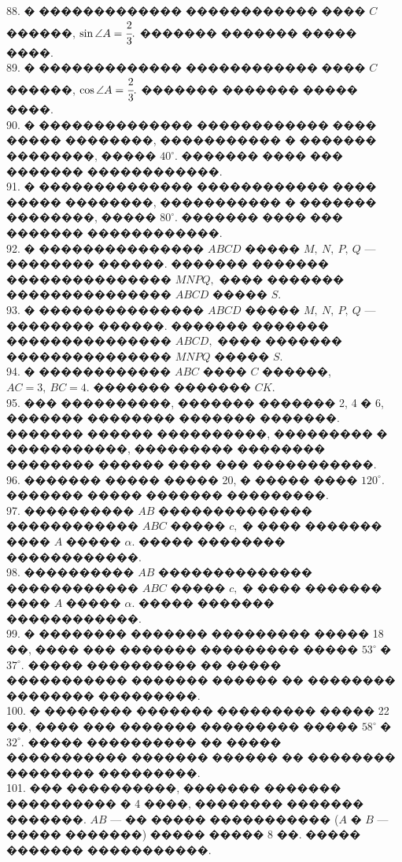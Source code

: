 \documentclass[12pt]{article}
\begin{document}
88. � ������������� ������������ ���� $C$ ������, $\sin \angle A=\cfrac{2}{3}.$ ������� ������� ����� ����.\\
89. � ������������� ������������ ���� $C$ ������, $\cos \angle A=\cfrac{2}{3}.$ ������� ������� ����� ����.\\
90. � �������������� ������������ ���� ����� ��������, ����������� � ������� ��������, ����� $40^\circ.$ ������� ���� ��� ������� ������������.\\
91. � �������������� ������������ ���� ����� ��������, ����������� � ������� ��������, ����� $80^\circ.$ ������� ���� ��� ������� ������������.\\
92. � ��������������� $ABCD$ ����� $M,\ N,\ P,\ Q$ --- �������� ������. ������� ������� ��������������� $MNPQ,$ ���� ������� ��������������� $ABCD$ ����� $S.$\\
93. � ��������������� $ABCD$ ����� $M,\ N,\ P,\ Q$ --- �������� ������. ������� ������� ��������������� $ABCD,$ ���� ������� ��������������� $MNPQ$ ����� $S.$\\
94. � ������������ $ABC$ ���� $C$ ������, $AC=3,\ BC=4.$ ������� ������� $CK.$\\
95. ��� ����������, ������� ������� 2, 4 � 6, ������� �������� ������� �������. ������� ������ ����������, ��������� � �����������, ��������� �������� �������� ������ ���� ��� �����������.\\
96. ������� ����� ����� 20, � ����� ���� $120^\circ.$ ������� ����� ������� ���������.\\
97. ���������� $AB$ �������������� ������������ $ABC$ ����� $c,$ � ���� ������� ���� $A$ ����� $\alpha.$ ����� �������� ������������.\\
98. ���������� $AB$ �������������� ������������ $ABC$ ����� $c,$ � ���� ������� ���� $A$ ����� $\alpha.$ ����� ������� ������������.\\
99. � �������� ������� ��������� ����� 18 ��, ���� ��� ������� ��������� ����� $53^\circ$ � $37^\circ.$ ����� ���������� �� ����� ����������� ������� ������ �� �������� �������� ���������.\\
100. � �������� ������� ��������� ����� 22 ��, ���� ��� ������� ��������� ����� $58^\circ$ � $32^\circ.$ ����� ���������� �� ����� ����������� ������� ������ �� �������� �������� ���������.\\
101. ��� ����������, ������� ������� ���������� � 4 ����, �������� ������� �������. $AB$ --- �� ����� ����������� ($A$ � $B$ --- ����� �������) ����� ����� 8 ��. ����� ������� �����������.\\
\end{document}
